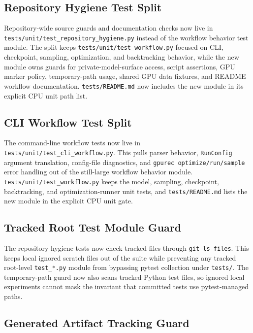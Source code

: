 \documentclass[11pt]{article}
\begin{document}
\subsection{Repository Hygiene Test Split}

Repository-wide source guards and documentation checks now live in
\texttt{tests/unit/test\_repository\_hygiene.py} instead of the workflow
behavior test module.  The split keeps \texttt{tests/unit/test\_workflow.py}
focused on CLI, checkpoint, sampling, optimization, and backtracking behavior,
while the new module owns guards for private-model-surface access, script
assertions, GPU marker policy, temporary-path usage, shared GPU data fixtures,
and README workflow documentation.  \texttt{tests/README.md} now includes the
new module in its explicit CPU unit path list.

\subsection{CLI Workflow Test Split}

The command-line workflow tests now live in
\texttt{tests/unit/test\_cli\_workflow.py}.  This pulls parser behavior,
\texttt{RunConfig} argument translation, config-file diagnostics, and
\texttt{gpurec optimize/run/sample} error handling out of the still-large
workflow behavior module.  \texttt{tests/unit/test\_workflow.py} keeps the
model, sampling, checkpoint, backtracking, and optimization-runner unit tests,
and \texttt{tests/README.md} lists the new module in the explicit CPU unit
gate.

\subsection{Tracked Root Test Module Guard}

The repository hygiene tests now check tracked files through
\texttt{git ls-files}.  This keeps local ignored scratch files out of the suite
while preventing any tracked root-level \texttt{test\_*.py} module from
bypassing pytest collection under \texttt{tests/}.  The temporary-path guard now
also scans tracked Python test files, so ignored local experiments cannot mask
the invariant that committed tests use pytest-managed paths.

\subsection{Generated Artifact Tracking Guard}
\end{document}

